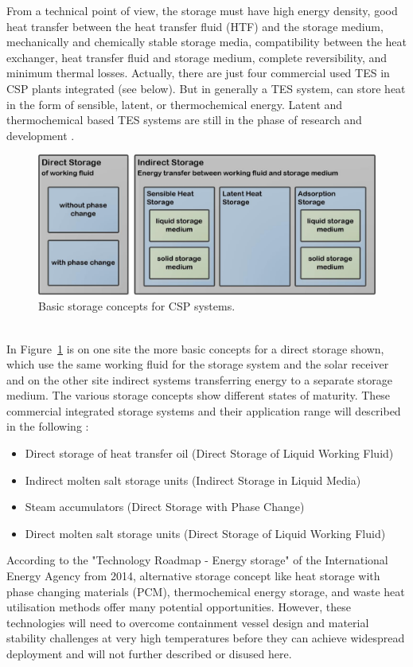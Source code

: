 \documentclass[Master,MEE,english]{twbook}%
\begin{document}
From a technical point of view, the storage must have high energy density, good heat transfer between the heat transfer fluid (HTF) and the storage medium, mechanically and chemically stable storage media, compatibility between the heat exchanger, heat transfer fluid and storage medium, complete reversibility, and minimum thermal losses. Actually, there are just four commercial used TES in CSP plants integrated (see below). But in generally a TES system, can store heat in the form of sensible, latent, or thermochemical energy. Latent and thermochemical based TES systems are still in the phase of research and development \cite{Steinmann2015}.
\begin{figure}[t]  
\centering
\includegraphics[width=0.75\linewidth]{FIG/Basicstorageconcepts}
\caption[Basic storage concepts for CSP systems.]{Basic storage concepts for CSP systems.}\label{Basicstorageconcepts}
\end{figure}
\\
In Figure~\ref{Basicstorageconcepts} is on one site the more basic concepts for a direct storage shown, which use the same working fluid for the storage system and the solar receiver and on the other site indirect systems transferring energy to a separate storage medium. The various storage concepts show different states of maturity. These commercial integrated storage systems and their application range will described in the following \cite{Steinmann2015}:
\begin{itemize}
\item Direct storage of heat transfer oil (Direct Storage of Liquid Working Fluid)
\item Indirect molten salt storage units (Indirect Storage in Liquid Media)
\item Steam accumulators (Direct Storage with Phase Change)
\item Direct molten salt storage units (Direct Storage of Liquid Working Fluid)
\end{itemize}
According to the "Technology Roadmap - Energy storage" of the International Energy Agency from 2014, alternative storage concept like heat storage with phase changing materials (PCM), thermochemical energy storage, and waste heat utilisation methods offer many potential opportunities. However, these technologies will need to overcome containment vessel design and material stability challenges at very high temperatures before they can achieve widespread deployment and will not further described or disused here. \cite{IEA2014e}\\
\end{document}
